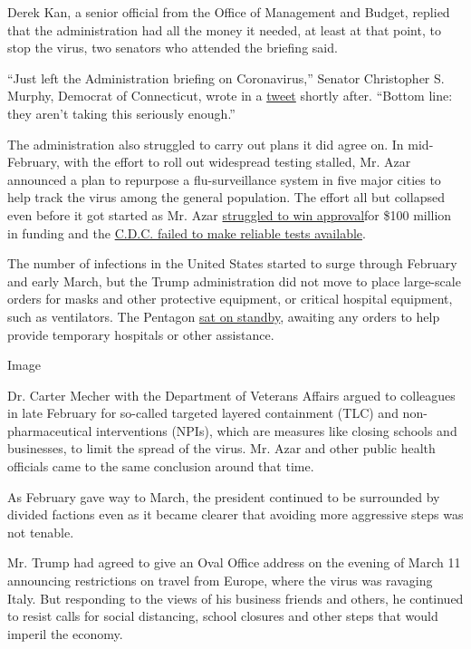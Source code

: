 Derek Kan, a senior official from the Office of Management and Budget,
replied that the administration had all the money it needed, at least at
that point, to stop the virus, two senators who attended the briefing
said.

``Just left the Administration briefing on Coronavirus,'' Senator
Christopher S. Murphy, Democrat of Connecticut, wrote in a
\href{https://twitter.com/chrismurphyct/status/1225073987639705600?lang=en}{tweet}
shortly after. ``Bottom line: they aren't taking this seriously
enough.''

The administration also struggled to carry out plans it did agree on. In
mid-February, with the effort to roll out widespread testing stalled,
Mr. Azar announced a plan to repurpose a flu-surveillance system in five
major cities to help track the virus among the general population. The
effort all but collapsed even before it got started as Mr. Azar
\href{https://int.graylady3jvrrxbe.onion/data/documenthelper/6873-2020-02-14-cdc-surveillance-fu/51b5187c0fd8b4698a50/optimized/full.pdf\#page=1}{struggled
to win approval}for \$100 million in funding and the
\href{https://www.nytimes3xbfgragh.onion/2020/03/10/us/coronavirus-testing-delays.html}{C.D.C.
failed to make reliable tests available}.

The number of infections in the United States started to surge through
February and early March, but the Trump administration did not move to
place large-scale orders for masks and other protective equipment, or
critical hospital equipment, such as ventilators. The Pentagon
\href{https://www.nytimes3xbfgragh.onion/2020/03/17/us/politics/coronavirus-government-army-corps.html}{sat
on standby}, awaiting any orders to help provide temporary hospitals or
other assistance.

Image

Dr. Carter Mecher with the Department of Veterans Affairs argued to
colleagues in late February for so-called targeted layered containment
(TLC) and non-pharmaceutical interventions (NPIs), which are measures
like closing schools and businesses, to limit the spread of the virus.
Mr. Azar and other public health officials came to the same conclusion
around that time.

As February gave way to March, the president continued to be surrounded
by divided factions even as it became clearer that avoiding more
aggressive steps was not tenable.

Mr. Trump had agreed to give an Oval Office address on the evening of
March 11 announcing restrictions on travel from Europe, where the virus
was ravaging Italy. But responding to the views of his business friends
and others, he continued to resist calls for social distancing, school
closures and other steps that would imperil the economy.

